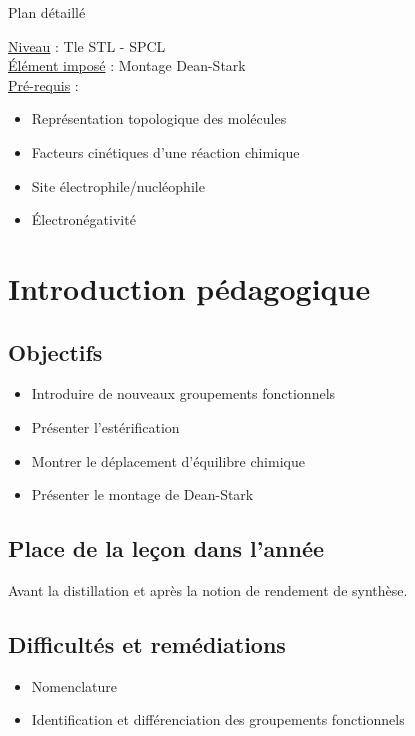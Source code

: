 \begin{reportBlock}{Plan détaillé}

\underline{Niveau} : Tle STL - SPCL \\

\underline{Élément imposé} : Montage Dean-Stark \\

\underline{Pré-requis} :
\begin{itemize}
\item Représentation topologique des molécules
\item Facteurs cinétiques d'une réaction chimique
\item Site électrophile/nucléophile
\item Électronégativité
\end{itemize}


\section*{Introduction pédagogique}

\subsection*{Objectifs}

\begin{itemize}
\item Introduire de nouveaux groupements fonctionnels
\item Présenter l'estérification
\item Montrer le déplacement d'équilibre chimique
\item Présenter le montage de Dean-Stark
\end{itemize}


\subsection*{Place de la leçon dans l'année}

Avant la distillation et après la notion de rendement de synthèse.

\subsection*{Difficultés et remédiations}

\begin{itemize}
\item Nomenclature
\item Identification et différenciation des groupements fonctionnels
\end{itemize}


\end{reportBlock}
